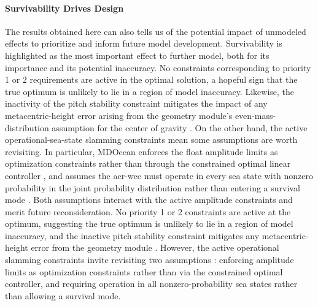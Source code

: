 \paragraph{Survivability Drives Design} %
The results obtained here can also tells us of the potential impact of unmodeled effects to prioritize and inform future model development.
Survivability is highlighted as the most important effect to further model, both for its importance and its potential inaccuracy.
\ifdefined\DISSERTATION
    No constraints corresponding to priority 1 or 2 requirements are active in the optimal solution, %
    a hopeful sign that the true optimum is unlikely to lie in a region of model inaccuracy.
    Likewise, the inactivity of the pitch stability constraint mitigates the impact of any metacentric-height error arising from the geometry module's even-mass-distribution assumption for the center of gravity \citep{mccabe_development_2026}.
    On the other hand, the active operational-sea-state slamming constraints mean some assumptions are worth revisiting.
    In particular, MDOcean enforces the float amplitude limits as optimization constraints rather than through the constrained optimal linear controller \citep{mccabe_development_2026}, and assumes the \gls{acr-wec} must operate in every sea state with nonzero probability in the joint probability distribution rather than entering a survival mode \citep{mccabe_development_2026}.
    Both assumptions interact with the active amplitude constraints and merit future reconsideration.
\else
    No priority 1 or 2 constraints are active at the optimum, suggesting the true optimum is unlikely to lie in a region of model inaccuracy, and the inactive pitch stability constraint mitigates any metacentric-height error from the geometry module \citep{mccabe_development_2026}.
    However, the active operational slamming constraints invite revisiting two assumptions \citep{mccabe_development_2026}: enforcing amplitude limits as optimization constraints rather than via the constrained optimal controller, and requiring operation in all nonzero-probability sea states rather than allowing a survival mode.
\fi

